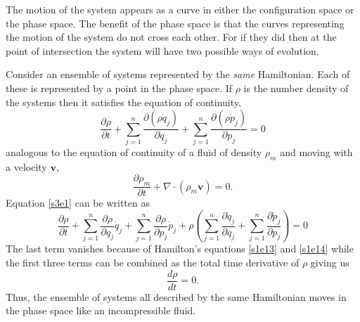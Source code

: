 \documentclass{article}
\numberwithin{equation}{section}
\let\vec\bm
\theoremstyle{plain}
\numberwithin{thm}{section}
\theoremstyle{plain}
\numberwithin{prop}{section}
\theoremstyle{definition}
\numberwithin{defn}{section}
\theoremstyle{remark}
\begin{document}
The motion of the system appears as a curve in either the configuration space
or the phase space. The benefit of the phase space is that the curves 
representing the motion of the system do not cross each other. For if they did
then at the point of intersection the system will have two possible ways of
evolution.

Consider an ensemble of systems represented by the \emph{same} Hamiltonian. 
Each of these is represented by a point in the phase space. If $\rho$ is the
number density of the systems then it satisfies the equation of continuity,
\begin{equation}\label{s3e1}
\frac{\partial\rho}{\partial t} + 
\sum_{j=1}^n\frac{\partial(\rho\dot{q}_j)}{\partial q_j} + 
\sum_{j=1}^n\frac{\partial(\rho\dot{p}_j)}{\partial p_j} = 0
\end{equation}
analogous to the equation of continuity of a fluid of density $\rho_m$ and
moving with a velocity $\vec{v}$,
\begin{equation}\label{s3e2}
\frac{\partial\rho_m}{\partial t} + \nabla\cdot(\rho_m\vec{v}) = 0.
\end{equation}
Equation \eqref{s3e1} can be written as
\begin{equation}\label{s3e3}
\frac{\partial\rho}{\partial t} + 
\sum_{j=1}^n\frac{\partial\rho}{\partial q_j} \dot{q}_j + 
\sum_{j=1}^n\frac{\partial\rho}{\partial p_j} \dot{p}_j + 
\rho\left(\sum_{j=1}^n\frac{\partial\dot{q}_j}{\partial q_j} + 
\sum_{j=1}^n\frac{\partial\dot{p}_j}{\partial p_j}\right)  = 0
\end{equation}
The last term vanishes because of Hamilton's equations \eqref{s1e13} and
\eqref{s1e14} while the first three terms can be combined as the total
time derivative of $\rho$ giving us
\begin{equation}\label{s3e4}
\frac{d\rho}{dt} = 0.
\end{equation}
Thus, the ensemble of systems all described by the same Hamiltonian moves in the
phase space like an incompressible fluid.
\end{document}
